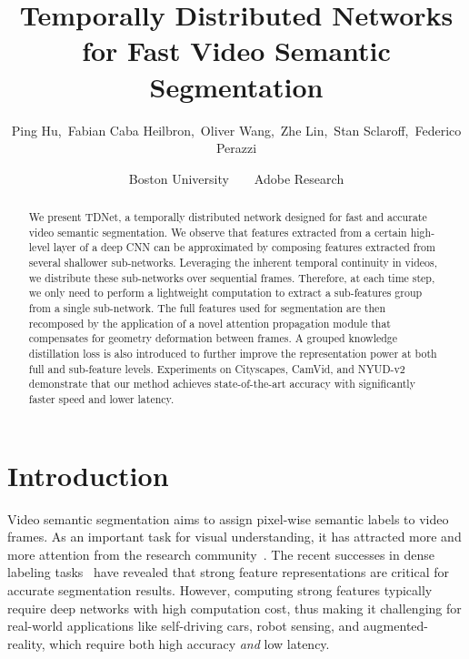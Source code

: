 \documentclass[10pt,twocolumn,letterpaper]{article}
\begin{document}
\title{Temporally Distributed Networks for Fast Video Semantic Segmentation}

\author{
Ping Hu,~Fabian Caba Heilbron,~Oliver Wang,~Zhe Lin,~Stan Sclaroff,~Federico Perazzi
\and Boston University~~~~Adobe Research}



\maketitle


\begin{abstract}
We present TDNet, a temporally distributed network designed for fast and accurate video semantic segmentation.
We observe that features extracted from a certain high-level layer of a deep CNN can be approximated by composing features extracted from several shallower sub-networks.
Leveraging the inherent temporal continuity in videos, we distribute these sub-networks over sequential frames.
Therefore, at each time step, we only need to perform a lightweight computation to extract a sub-features group from a single sub-network.
The full features used for segmentation are then recomposed by the application of a novel attention propagation module that compensates for geometry deformation between frames.
A grouped knowledge distillation loss is also introduced to further improve the representation power at both full and sub-feature levels.
Experiments on Cityscapes, CamVid, and NYUD-v2 demonstrate that our method achieves state-of-the-art accuracy with significantly faster speed and lower latency.
\end{abstract}












 \section{Introduction}
Video semantic segmentation aims to assign pixel-wise semantic labels to video frames.
As an important task for visual understanding, it has attracted more and more attention from the research community~\cite{jin2017video,li2018low,nilsson2018semantic,shelhamer2016clockwork}. 
The recent successes in dense labeling tasks~\cite{chen2018encoder,fu2018dual,li2019expectation,liu2019auto, wu2019wider,zhao2017pyramid,zhang2018context,Zhu_2019_CVPR} have revealed that strong feature representations are critical for accurate segmentation results. 
However, computing strong features typically require deep networks with high computation cost, thus making it challenging for real-world applications like self-driving cars, robot sensing, and augmented-reality, which require both high accuracy \emph{and} low latency. 
\end{document}
